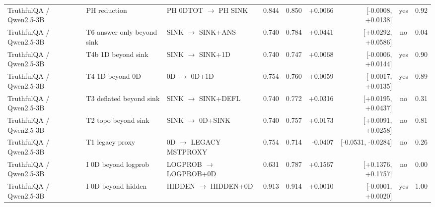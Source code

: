 {\begin{tabular}{lllrrrrcc}
TruthfulQA / Qwen2.5-3B & PH reduction & PH 0DTOT $\to$ PH SINK & 0.844 & 0.850 & +0.0066 & [-0.0008, +0.0138] & yes & 0.92 \\
TruthfulQA / Qwen2.5-3B & T6 answer only beyond sink & SINK $\to$ SINK+ANS & 0.740 & 0.784 & +0.0441 & [+0.0292, +0.0586] & no & 0.04 \\
TruthfulQA / Qwen2.5-3B & T4b 1D beyond sink & SINK $\to$ SINK+1D & 0.740 & 0.747 & +0.0068 & [-0.0006, +0.0144] & yes & 0.90 \\
TruthfulQA / Qwen2.5-3B & T4 1D beyond 0D & 0D $\to$ 0D+1D & 0.754 & 0.760 & +0.0059 & [-0.0017, +0.0135] & yes & 0.89 \\
TruthfulQA / Qwen2.5-3B & T3 deflated beyond sink & SINK $\to$ SINK+DEFL & 0.740 & 0.772 & +0.0316 & [+0.0195, +0.0437] & no & 0.31 \\
TruthfulQA / Qwen2.5-3B & T2 topo beyond sink & SINK $\to$ 0D+SINK & 0.740 & 0.757 & +0.0173 & [+0.0091, +0.0258] & no & 0.81 \\
TruthfulQA / Qwen2.5-3B & T1 legacy proxy & 0D $\to$ LEGACY MSTPROXY & 0.754 & 0.714 & -0.0407 & [-0.0531, -0.0284] & no & 0.26 \\
TruthfulQA / Qwen2.5-3B & I 0D beyond logprob & LOGPROB $\to$ LOGPROB+0D & 0.631 & 0.787 & +0.1567 & [+0.1376, +0.1757] & no & 0.00 \\
TruthfulQA / Qwen2.5-3B & I 0D beyond hidden & HIDDEN $\to$ HIDDEN+0D & 0.913 & 0.914 & +0.0010 & [-0.0001, +0.0020] & yes & 1.00 \\
\bottomrule
\end{tabular}
}
